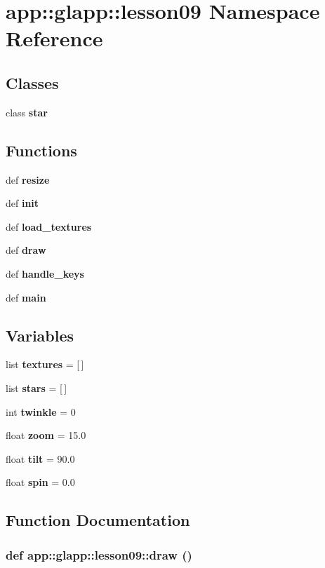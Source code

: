 \section{app::glapp::lesson09 Namespace Reference}
\label{namespaceapp_1_1glapp_1_1lesson09}


\subsection*{Classes}
\begin{CompactItemize}
\item 
class {\bf star}
\end{CompactItemize}
\subsection*{Functions}
\begin{CompactItemize}
\item 
def {\bf resize}
\item 
def {\bf init}
\item 
def {\bf load\_\-textures}
\item 
def {\bf draw}
\item 
def {\bf handle\_\-keys}
\item 
def {\bf main}
\end{CompactItemize}
\subsection*{Variables}
\begin{CompactItemize}
\item 
list {\bf textures} = [$\,$]
\item 
list {\bf stars} = [$\,$]
\item 
int {\bf twinkle} = 0
\item 
float {\bf zoom} = 15.0
\item 
float {\bf tilt} = 90.0
\item 
float {\bf spin} = 0.0
\end{CompactItemize}


\subsection{Function Documentation}
\subsubsection{\setlength{\rightskip}{0pt plus 5cm}def app::glapp::lesson09::draw ()}\label{namespaceapp_1_1glapp_1_1lesson09_24b577e388ac41bba4e397ac65487cdf}




